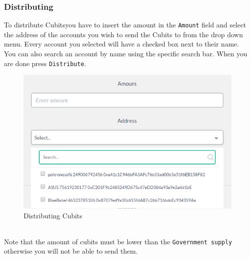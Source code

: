 		\subsubsection{Distributing}
		To distribute Cubits\glosp you have to insert the amount in the \texttt{Amount} 
		field and select the address of the accounts you wish to send the Cubits to 
		from the drop down menu. Every account you selected will have a checked 
		box next to their name. You can also search an account by name using the 
		specific search bar. When you are done press \texttt{Distribute}.\\
		\begin{figure}[H]
			\includegraphics[width=15cm]{res/images/distributing.png}
			\centering
			\caption{Distributing Cubits}
		\end{figure} \mbox{}\\
		\noindent Note that the amount of cubits must be lower than the \texttt{Government  
		supply} otherwise you will not be able to send them.
